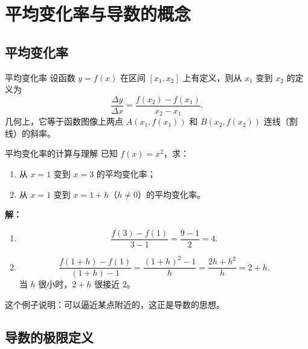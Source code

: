 \documentclass[a4paper,11pt]{ctexart}
\begin{document}
\begin{roadmap}
\end{roadmap}


\section{平均变化率与导数的概念}

\subsection{平均变化率}

\begin{definitionbox}{平均变化率}
设函数 $y=f(x)$ 在区间 $[x_1,x_2]$ 上有定义，则从 $x_1$ 变到 $x_2$ 的定义为
\[
  \dfrac{\Delta y}{\Delta x}
  = \dfrac{f(x_2)-f(x_1)}{x_2-x_1}.
\]
几何上，它等于函数图像上两点 $A(x_1,f(x_1))$ 和 $B(x_2,f(x_2))$ 连线（割线）的斜率。
\end{definitionbox}

\begin{examplebox}{平均变化率的计算与理解}
已知 $f(x)=x^2$，求：
\begin{enumerate}
  \item 从 $x=1$ 变到 $x=3$ 的平均变化率；
  \item 从 $x=1$ 变到 $x=1+h$（$h\neq 0$）的平均变化率。
\end{enumerate}
\textbf{解：}
\begin{enumerate}
  \item
  \[
    \dfrac{f(3)-f(1)}{3-1}
    = \dfrac{9-1}{2}
    = 4.
  \]
  \item
  \[
    \dfrac{f(1+h)-f(1)}{(1+h)-1}
    = \dfrac{(1+h)^2-1}{h}
    = \dfrac{2h+h^2}{h}
    = 2+h.
  \]
  当 $h$ 很小时，$2+h$ 很接近 $2$。
\end{enumerate}
这个例子说明：可以逼近某点附近的，这正是导数的思想。
\end{examplebox}

\subsection{导数的极限定义}
\end{document}
